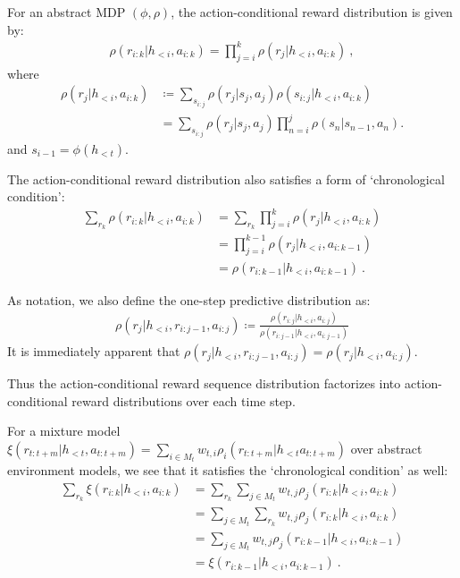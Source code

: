     For an abstract MDP $(\phi, \rho)$, the action-conditional reward distribution is given by:
    \begin{align*}
        \rho(r_{i:k} | h_{<i}, a_{i:k}) = \prod_{j=i}^{k} \rho(r_j | h_{<i}, a_{i:k})~,
    \end{align*}
    where
    \begin{align*}
        \rho(r_j | h_{<i}, a_{i:k}) &\coloneqq \sum_{s_{i:j}} \rho(r_j | s_j, a_j) \rho(s_{i:j} | h_{<i}, a_{i:k})\\
        &= \sum_{s_{i:j}} \rho(r_j | s_j, a_j) \prod_{n=i}^{j} \rho(s_{n} | s_{n-1}, a_{n}).
    \end{align*}
    and $s_{i-1} = \phi(h_{<t})$.
    
    The action-conditional reward distribution also satisfies a form of `chronological condition':
    \begin{align*}
        \sum_{r_{k}} \rho(r_{i:k} | h_{<i}, a_{i:k}) &= \sum_{r_{k}} \prod_{j = i}^{k} \rho(r_j | h_{<i}, a_{i:k})\\
        &= \prod_{j = i}^{k-1} \rho(r_j | h_{<i}, a_{i:k-1})\\
        &= \rho(r_{i:k-1} | h_{<i}, a_{i:k-1})~. 
    \end{align*}
    
    As notation, we also define the one-step predictive distribution as:
    \begin{align*}
        \rho(r_{j} | h_{<i}, r_{i:j-1}, a_{i:j}) \coloneqq \frac{\rho(r_{i:j} | h_{<i}, a_{i:j})}{\rho(r_{i:j-1} | h_{<i}, a_{i:j-1})}
    \end{align*}
    It is immediately apparent that $\rho(r_{j} | h_{<i}, r_{i:j-1}, a_{i:j}) = \rho(r_j | h_{<i}, a_{i:j})$. 
    \hfill \newline
    
    Thus the action-conditional reward sequence distribution factorizes into action-conditional reward distributions over each time step. 
    
    For a mixture model $\xi(r_{t:t+m} | h_{<t}, a_{t:t+m}) = \sum_{i \in M_t} w_{t, i} \rho_i(r_{t:t+m} | h_{<t} a_{t:t+m})$ over abstract environment models, we see that it satisfies the `chronological condition' as well:
    \begin{align*}
        \sum_{r_{k}} \xi(r_{i:k} | h_{<i}, a_{i:k}) &= \sum_{r_{k}} \sum_{j \in M_t} w_{t, j} \rho_j(r_{i:k} | h_{<i}, a_{i:k})\\
        &= \sum_{j \in M_t} \sum_{r_{k}} w_{t, j} \rho_j(r_{i:k} | h_{<i}, a_{i:k})\\
        &= \sum_{j \in M_t} w_{t, j} \rho_j(r_{i:k-1} | h_{<i}, a_{i:k-1})\\
        &= \xi(r_{i:k-1} | h_{<i}, a_{i:k-1})~. 
    \end{align*}
    
